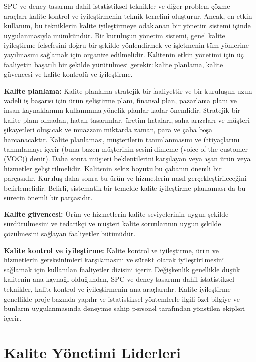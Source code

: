 \documentclass[
]{book}
\begin{document}
SPC ve deney tasarımı dahil istatistiksel teknikler ve diğer problem çözme araçları kalite kontrol ve iyileştirmenin teknik temelini oluşturur. Ancak, en etkin kullanım, bu tekniklerin kalite iyileştirmeye odaklanan bir yönetim sistemi içinde uygulanmasıyla mümkündür. Bir kuruluşun yönetim sistemi, genel kalite iyileştirme felsefesini doğru bir şekilde yönlendirmek ve işletmenin tüm yönlerine yayılmasını sağlamak için organize edilmelidir. Kalitenin etkin yönetimi için üç faaliyetin başarılı bir şekilde yürütülmesi gerekir: kalite planlama, kalite güvencesi ve kalite kontrolü ve iyileştirme.

\textbf{Kalite planlama:} Kalite planlama stratejik bir faaliyettir ve bir kuruluşun uzun vadeli iş başarısı için ürün geliştirme planı, finansal plan, pazarlama planı ve insan kaynaklarının kullanımına yönelik planlar kadar önemlidir. Stratejik bir kalite planı olmadan, hatalı tasarımlar, üretim hataları, saha arızaları ve müşteri şikayetleri oluşacak ve muazzam miktarda zaman, para ve çaba boşa harcanacaktır. Kalite planlaması, müşterilerin tanımlanmasını ve ihtiyaçlarını tanımlamayı içerir (buna bazen müşterinin sesini dinleme (voice of the customer (VOC)) denir). Daha sonra müşteri beklentilerini karşılayan veya aşan ürün veya hizmetler geliştirilmelidir. Kalitenin sekiz boyutu bu çabanın önemli bir parçasıdır. Kuruluş daha sonra bu ürün ve hizmetlerin nasıl gerçekleştirileceğini belirlemelidir. Belirli, sistematik bir temelde kalite iyileştirme planlaması da bu sürecin önemli bir parçasıdır.

\textbf{Kalite güvencesi:} Ürün ve hizmetlerin kalite seviyelerinin uygun şekilde sürdürülmesini ve tedarikçi ve müşteri kalite sorunlarının uygun şekilde çözülmesini sağlayan faaliyetler bütünüdür.

\textbf{Kalite kontrol ve iyileştirme:} Kalite kontrol ve iyileştirme, ürün ve hizmetlerin gereksinimleri karşılamasını ve sürekli olarak iyileştirilmesini sağlamak için kullanılan faaliyetler dizisini içerir. Değişkenlik genellikle düşük kalitenin ana kaynağı olduğundan, SPC ve deney tasarımı dahil istatistiksel teknikler, kalite kontrol ve iyileştirmenin ana araçlarıdır. Kalite iyileştirme genellikle proje bazında yapılır ve istatistiksel yöntemlerle ilgili özel bilgiye ve bunların uygulanmasında deneyime sahip personel tarafından yönetilen ekipleri içerir.

\hypertarget{kalite-yuxf6netimi-liderleri}{%
\section{Kalite Yönetimi Liderleri}\label{kalite-yuxf6netimi-liderleri}}
\end{document}
